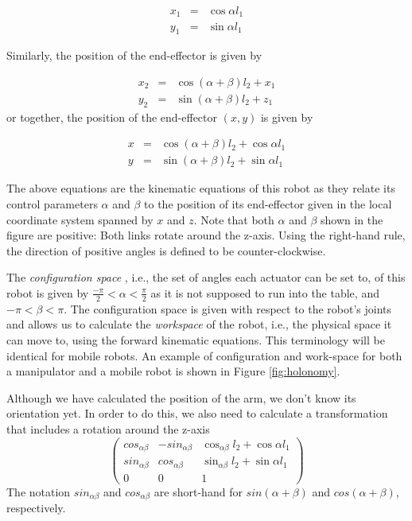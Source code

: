 \begin{eqnarray}
x_1 &=&\cos \alpha l_1\\
y_1 &=&\sin \alpha l_1
\end{eqnarray}

Similarly, the position of the end-effector is given by

\begin{eqnarray}
x_2&=&\cos(\alpha+\beta)l_2+x_1\\
y_2&=&\sin(\alpha+\beta)l_2+z_1
\end{eqnarray}
%
or together, the position of the end-effector $(x,y)$ is given by

\begin{eqnarray}\label{eq:cosx}
x&=&\cos(\alpha+\beta)l_2+\cos\alpha l_1\\
y&=&\sin(\alpha+\beta)l_2+\sin\alpha l_1
\end{eqnarray}

The above equations are the kinematic equations of this robot as they relate its control parameters $ \alpha$ and $ \beta$ to the position of its end-effector given in the local coordinate system spanned by $ x$ and $ z$. Note that both $\alpha$ and $\beta$ shown in the figure are positive: Both links rotate around the z-axis. Using the right-hand rule, the direction of positive angles is defined to be counter-clockwise. 

The \emph{configuration space} , i.e., the set of angles each actuator can be set to, of this robot is given by $ \frac{-\pi}{2}<\alpha<\frac{\pi}{2}$ as it is not supposed to run into the table, and $ -\pi < \beta < \pi$. The configuration space is given with respect to the robot's joints and allows us to calculate the \emph{workspace} of the robot, i.e., the physical space it can move to, using the forward kinematic equations. This terminology will be identical for mobile robots. An example of configuration and work-space for both a manipulator and a mobile robot is shown in Figure \ref{fig:holonomy}.

Although we have calculated the position of the arm, we don't know its orientation yet. In order to do this, we also need to calculate a transformation that includes a rotation around the z-axis
\begin{equation}
\label{eq:2armtrans}
\left(\begin{array}{lll}cos_{\alpha\beta} & -sin_{\alpha\beta} &  \cos_{\alpha\beta}l_2+\cos\alpha l_1\\
                        sin_{\alpha\beta} & cos_{\alpha\beta} & \sin_{\alpha\beta}l_2+\sin\alpha l_1\\
												0 & 0 & 1\end{array}\right)
\end{equation}
The notation $sin_{\alpha\beta}$ and $cos_{\alpha\beta}$ are short-hand for $sin(\alpha+\beta)$ and $cos(\alpha+\beta)$, respectively.


